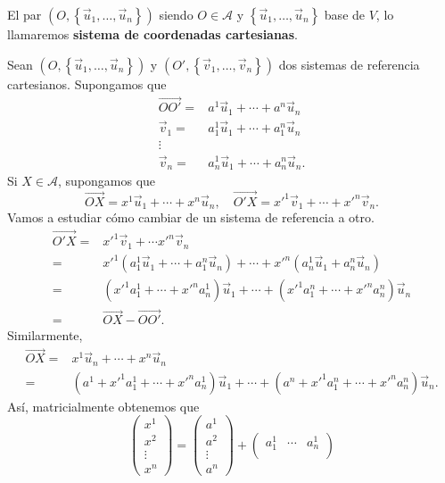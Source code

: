 \begin{fdefinition}
	\normalfont El par $\displaystyle \left(O, \left\{ \vec{u}_{1}, \ldots, \vec{u}_{n}\right\} \right) $ siendo $\displaystyle O \in \mathcal{A} $ y $\displaystyle \left\{ \vec{u}_{1}, \ldots, \vec{u}_{n}\right\}  $ base de $\displaystyle V $, lo llamaremos \textbf{sistema de coordenadas cartesianas}. 
\end{fdefinition}
\begin{observation}
\normalfont Sean $\displaystyle \left(O, \left\{ \vec{u}_{1}, \ldots, \vec{u}_{n}\right\} \right) $ y $\displaystyle \left(O', \left\{ \vec{v}_{1}, \ldots, \vec{v}_{n}\right\} \right) $ dos sistemas de referencia cartesianos. Supongamos que 
\[
\begin{split}
	\overrightarrow{O O '} = & a^{1}\vec{u}_{1} + \cdots + a^{n}\vec{u}_{n} \\
	\vec{v}_{1} = & a^{1}_{1}\vec{u}_{1} + \cdots + a^{n}_{1}\vec{u}_{n} \\
	\vdots & \\
	\vec{v}_{n} = & a^{1}_{n}\vec{u}_{1} + \cdots + a^{n}_{n}\vec{u}_{n}	.
\end{split}
\]
Si $\displaystyle X \in \mathcal{A} $, supongamos que 
\[\overrightarrow{OX} = x^{1}\vec{u}_{1} + \cdots + x^{n}\vec{u}_{n}, \quad \overrightarrow{O'X}=x'^{1}\vec{v}_{1} + \cdots + x'^{n}\vec{v}_{n} .\]
Vamos a estudiar cómo cambiar de un sistema de referencia a otro. 
\[
\begin{split}
	\overrightarrow{O'X} = & x'^{1}\vec{v}_{1} + \cdots x'^{n}\vec{v}_{n} \\
	= & x'^{1}\left(a^{1}_{1}\vec{u}_{1} + \cdots + a^{n}_{1}\vec{u}_{n}\right) + \cdots + x'^{n}\left(a^{1}_{n} \vec{u}_{1} + a^{n}_{n}\vec{u}_{n}\right) \\
	= & \left(x'^{1}a^{1}_{1} + \cdots + x'^{n}a^{1}_{n}\right)\vec{u}_{1} + \cdots + \left(x'^{1}a^{n}_{1} + \cdots + x'^{n}a^{n}_{n}\right)\vec{u}_{n} \\
	= & \overrightarrow{OX}-\overrightarrow{O O'}.
\end{split}
\]
Similarmente,
\[
\begin{split}
	\overrightarrow{OX} = & x^{1}\vec{u}_{n} + \cdots + x^{n}\vec{u}_{n} \\
	= & \left(a^{1} + x'^{1}a^{1}_{1} + \cdots + x'^{n}a_{n}^{1}\right)\vec{u}_{1} + \cdots + \left(a^{n} + x'^{1}a_{1}^{n} + \cdots + x'^{n}a^{n}_{n}\right)\vec{u}_{n} .
\end{split}
\]
Así, matricialmente obtenemos que
\[\begin{pmatrix} x^{1} \\ x^{2} \\ \vdots \\ x^{n} \end{pmatrix} = \begin{pmatrix} a^{1} \\ a^{2} \\ \vdots \\ a^{n} \end{pmatrix} + \begin{pmatrix} a^{1}_{1} & \cdots & a^{1}_{n} \\

\end{pmatrix}\]
\end{observation}
